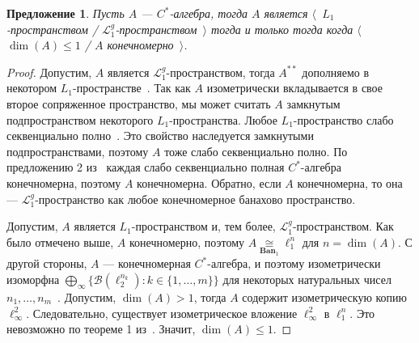 \documentclass[12pt]{article}
\newtheorem{proposition}[theorem]{Предложение}
\newcommand{\isom}[1]{\mathop{\mathbin{\cong}}\limits_{#1}}
\begin{document}
\begin{proposition}\label{CStarAlgIsL1IfFinDim} Пусть $A$ --- $C^*$-алгебра,
тогда $A$ является $\langle$~$L_1$-пространством /
$\mathcal{L}_1^g$-пространством~$\rangle$ тогда и только тогда когда
$\langle$~$\operatorname{dim}(A)\leq 1$ / $A$ конечномерно~$\rangle$.
\end{proposition}
\begin{proof} Допустим, $A$ является $\mathcal{L}_1^g$-пространством, тогда
$A^{**}$ дополняемо в некотором $L_1$-пространстве~\cite[следствие
23.2.1(2)]{DefFloTensNorOpId}. Так как $A$ изометрически вкладывается в свое
второе сопряженное пространство, мы может считать $A$ замкнутым подпространством
некоторого $L_1$-пространства. Любое $L_1$-пространство слабо секвенциально
полно~\cite[следствие III.C.14]{WojBanSpForAnalysts}. Это свойство наследуется
замкнутыми подпространствами, поэтому $A$ тоже слабо секвенциально полно. По
предложению 2 из~\cite{SakWeakCompOpOnOpAlg} каждая слабо секвенциально полная
$C^*$-алгебра конечномерна, поэтому $A$ конечномерна. Обратно, если $A$
конечномерна, то она --- $\mathcal{L}_1^g$-пространство как любое конечномерное
банахово пространство.

Допустим, $A$ является $L_1$-пространством и, тем более,
$\mathcal{L}_1^g$-пространством. Как было отмечено выше, $A$ конечномерно,
поэтому $A\isom{\mathbf{Ban}_1}\ell_1^n$ для $n=\operatorname{dim}(A)$. С другой
стороны, $A$ --- конечномерная $C^*$-алгебра, и поэтому изометрически изоморфна
$\bigoplus_\infty \{ \mathcal{B}(\ell_2^{n_k}):k\in \{1,\ldots,m \} \}$ для
некоторых натуральных чисел $n_1,\ldots,n_m$~\cite[теорема
III.1.1]{DavCSatrAlgByExmpl}. Допустим, $\operatorname{dim}(A)>1$, тогда $A$
содержит изометрическую копию $\ell_\infty^2$. Следовательно, существует
изометрическое вложение $\ell_\infty^2$ в $\ell_1^n$. Это невозможно по теореме
1 из~\cite{LyubIsomEmdbFinDimLp}. Значит, $\operatorname{dim}(A)\leq 1$. 
\end{proof}
\end{document}
